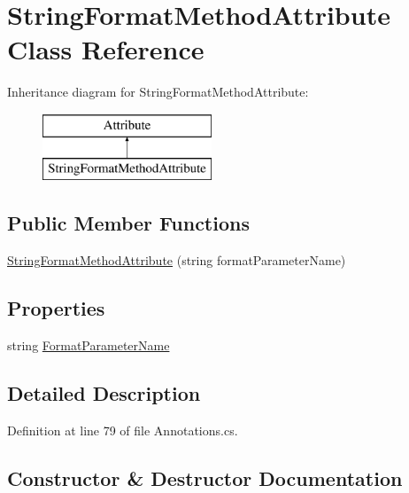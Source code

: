 \hypertarget{class_string_format_method_attribute}{}\section{String\+Format\+Method\+Attribute Class Reference}
\label{class_string_format_method_attribute}
Inheritance diagram for String\+Format\+Method\+Attribute\+:\begin{figure}[H]
\begin{center}
\leavevmode
\includegraphics[height=2.000000cm]{class_string_format_method_attribute}
\end{center}
\end{figure}
\subsection*{Public Member Functions}
\begin{DoxyCompactItemize}
\item 
\hyperlink{class_string_format_method_attribute_a39256792ebf736db384513a1e9d88240}{String\+Format\+Method\+Attribute} (string format\+Parameter\+Name)
\end{DoxyCompactItemize}
\subsection*{Properties}
\begin{DoxyCompactItemize}
\item 
string \hyperlink{class_string_format_method_attribute_a93e8904b7dfa6cdd20798a5ae4d3423e}{Format\+Parameter\+Name}
\end{DoxyCompactItemize}


\subsection{Detailed Description}


Definition at line 79 of file Annotations.\+cs.



\subsection{Constructor \& Destructor Documentation}
\hypertarget{class_string_format_method_attribute_a39256792ebf736db384513a1e9d88240}{}
